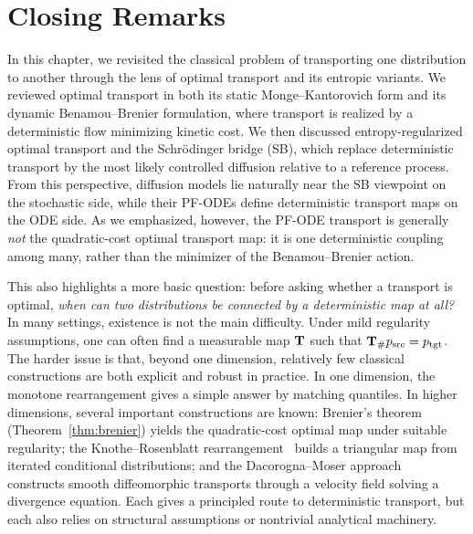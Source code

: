 \section{Closing Remarks}
In this chapter, we revisited the classical problem of transporting one
distribution to another through the lens of optimal transport and its
entropic variants. We reviewed optimal transport in both its static
Monge--Kantorovich form and its dynamic Benamou--Brenier formulation,
where transport is realized by a deterministic flow minimizing kinetic
cost. We then discussed entropy-regularized optimal transport and the
Schr\"odinger bridge (SB), which replace deterministic transport by the
most likely controlled diffusion relative to a reference process. From
this perspective, diffusion models lie naturally near the SB viewpoint
on the stochastic side, while their PF-ODEs define deterministic
transport maps on the ODE side. As we emphasized, however, the PF-ODE
transport is generally \emph{not} the quadratic-cost optimal transport
map: it is one deterministic coupling among many, rather than the
minimizer of the Benamou--Brenier action.

This also highlights a more basic question: before asking whether a
transport is optimal, \emph{when can two distributions be connected by a
deterministic map at all?} In many settings, existence is not the main
difficulty. Under mild regularity assumptions, one can often find a
measurable map ${\mathbf{T}}$ such that
${\mathbf{T}}_\# p_{\mathrm{src}} = p_{\mathrm{tgt}}$. The harder issue is that,
beyond one dimension, relatively few classical constructions are both
explicit and robust in practice. In one dimension, the monotone
rearrangement gives a simple answer by matching quantiles. In higher
dimensions, several important constructions are known: Brenier's theorem
(Theorem~\ref{thm:brenier}) yields the quadratic-cost optimal map under
suitable regularity; the Knothe--Rosenblatt
rearrangement~\citep{rosenblatt1952remarks,knothe1957contributions}
builds a triangular map from iterated conditional distributions; and the
Dacorogna--Moser approach~\citep{dacorogna1990partial} constructs smooth
diffeomorphic transports through a velocity field solving a divergence
equation. Each gives a principled route to deterministic transport, but
each also relies on structural assumptions or nontrivial analytical
machinery.

